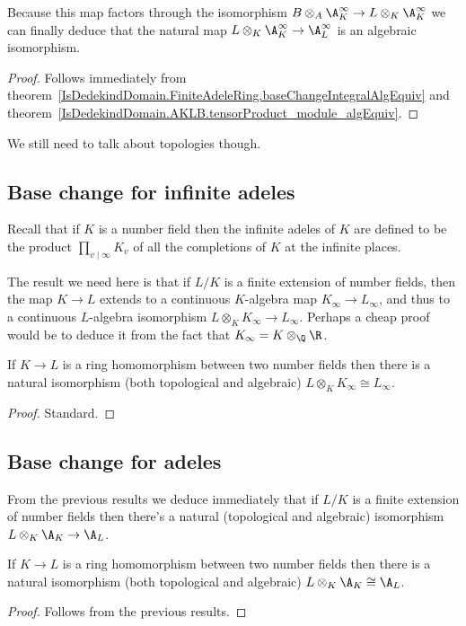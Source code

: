 Because this map factors through the isomorphism $B\otimes_A\A_K^\infty\to L\otimes_K\A_K^\infty$
we can finally deduce that the natural map $L\otimes_K\A_K^\infty\to\A_L^\infty$ is an algebraic
  isomorphism.
\begin{proof}
  Follows immediately from theorem~\ref{IsDedekindDomain.FiniteAdeleRing.baseChangeIntegralAlgEquiv}
  and theorem~\ref{IsDedekindDomain.AKLB.tensorProduct_module_algEquiv}.
\end{proof}

We still need to talk about topologies though.

\subsection{Base change for infinite adeles}

Recall that if $K$ is a number field then the infinite adeles of $K$ are defined
to be the product $\prod_{v\mid\infty} K_v$ of all the completions of $K$ at the
infinite places.

The result we need here is that if $L/K$ is a finite extension of number fields,
then the map $K\to L$ extends to a continuous $K$-algebra map $K_\infty\to L_\infty$,
and thus to a continuous $L$-algebra isomorphism $L\otimes_KK_\infty\to L_\infty$.
Perhaps a cheap proof would be to deduce it from the fact that $K_\infty=K\otimes_{\Q}\R$.

\begin{theorem}
  \label{NumberField.InfiniteAdeleRing.baseChangeEquiv}
  If $K\to L$ is a ring homomorphism between two number fields then there is a natural isomorphism
  (both topological and algebraic) $L\otimes_KK_\infty\cong L_\infty$.
\end{theorem}
\begin{proof}
  Standard.
\end{proof}


\subsection{Base change for adeles}

From the previous results we deduce immediately that if $L/K$ is a finite extension
of number fields then there's a natural (topological and algebraic) isomorphism
$L\otimes_K\A_K\to \A_L$.

\begin{theorem}
  \label{NumberField.AdeleRing.baseChangeEquiv}
  If $K\to L$ is a ring homomorphism between two number fields then there is a natural isomorphism
  (both topological and algebraic) $L\otimes_K\A_K\cong\A_L$.
\end{theorem}
\begin{proof}
  Follows from the previous results.
\end{proof}

